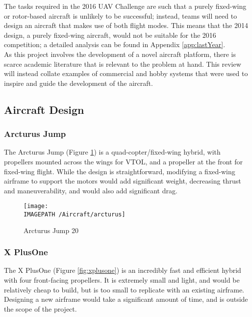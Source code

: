 The tasks required in the 2016 UAV Challenge are such that a purely fixed-wing or rotor-based aircraft is unlikely to be successful; instead, teams will need to design an aircraft that makes use of both flight modes. This means that the 2014 design, a purely fixed-wing aircraft, would not be suitable for the 2016 competition; a detailed analysis can be found in Appendix \ref{app:lastYear}.\\

As this project involves the development of a novel aircraft platform, there is scarce academic literature that is relevant to the problem at hand. This review will instead collate examples of commercial and hobby systems that were used to inspire and guide the development of the aircraft.\\

\subsection{Aircraft Design}
\subsubsection*{Arcturus Jump}
The Arcturus Jump\cite{ref:arcturus} (Figure \ref{fig:arcturus}) is a quad-copter/fixed-wing hybrid, with propellers mounted across the wings for VTOL, and a propeller at the front for fixed-wing flight. While the design is straightforward, modifying a fixed-wing airframe to support the motors would add significant weight, decreasing thrust and maneuverability, and would also add significant drag.

\begin{figure}[!h]
	\centering
	\texttt{[image: \\IMAGEPATH /Aircraft/arcturus]}
	\caption{Arcturus Jump 20}
	\label{fig:arcturus}
\end{figure}

\subsubsection*{X PlusOne}
The X PlusOne\cite{ref:xplusone} (Figure \ref{fig:xplusone}) is an incredibly fast and efficient hybrid with four front-facing propellers. It is extremely small and light, and would be relatively cheap to build, but is too small to replicate with an existing airframe. Designing a new airframe would take a significant amount of time, and is outside the scope of the project.

